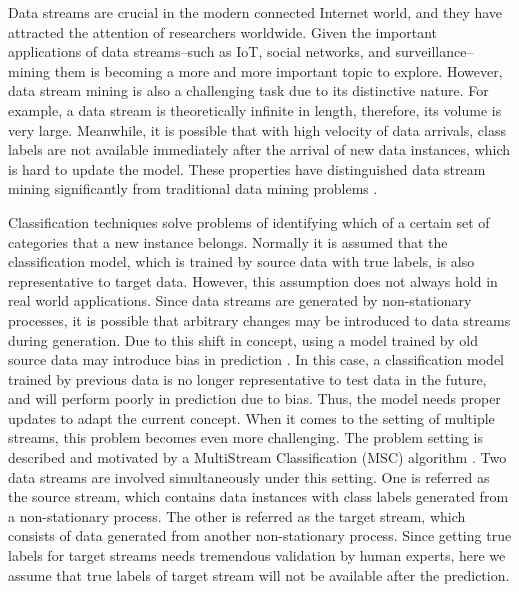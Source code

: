 Data streams are crucial in  the modern connected Internet 
world, and they have attracted the attention of researchers worldwide. Given the important
applications of data streams--such as IoT, social networks, and surveillance--mining them is becoming a more and more important topic to explore. 
However, data stream mining is also a challenging task due to its distinctive nature. 
For example, a data stream is theoretically infinite in length, therefore, its volume
is very large. Meanwhile, it is possible that with high velocity of data arrivals, class labels are not available immediately after the arrival of new data instances, which is hard to update the model. 
These properties have distinguished data 
stream mining significantly from traditional data mining problems \cite{haque2016SAND}.


Classification techniques solve problems of identifying which of a certain set of categories
that a new instance belongs. Normally it is assumed that the classification model, which is
trained by source data with true labels, is also representative to target data.
However, this assumption does not always hold in real world applications. Since data streams are generated
by non-stationary processes, it is possible that arbitrary changes may be introduced to data streams during generation. 
Due to this shift in concept, using a model trained by old source data may introduce bias
in prediction \cite{herlihy1993methodology}.
In this case, a classification model trained by previous data is no longer representative to test
data in the future, and will perform poorly in prediction due to bias. Thus, the model needs proper updates to adapt the current concept.
When it comes to the setting of multiple streams, this problem becomes even
more challenging. The problem setting is described and motivated by a MultiStream
Classification (MSC) algorithm \cite{chandra2016adaptive}. Two data streams are
involved simultaneously under this setting. One is referred as the source stream,
which contains data instances with class labels generated from a non-stationary
process. The other is referred as the target stream, which consists of data generated
from another non-stationary process. Since getting true labels for target streams needs tremendous validation by human experts, here
we assume that true labels of target stream will not be available after the prediction.  

